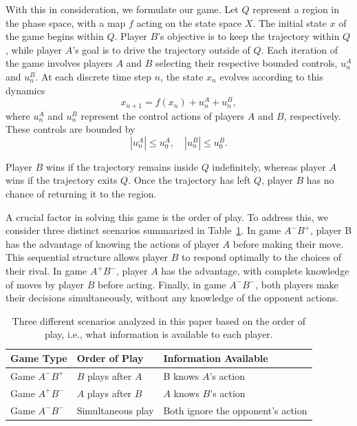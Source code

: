 With this in consideration, we formulate our game. Let $Q$ represent a region in the phase space, with a map $f$ acting on the state space $X$. The initial state $x$ of the game begins within $Q$. Player $B$'s objective is to keep the trajectory within $Q$, while player $A$'s goal is to drive the trajectory outside of $Q$. Each iteration of the game involves players $A$ and $B$ selecting their respective bounded controls, $u_n^A$ and $u_n^B$. At each discrete time step $n$, the state $x_n$ evolves according to this dynamics
\begin{equation}
    x_{n+1} = f(x_n) + u_n^A + u_n^B,
\end{equation}
where $u_n^A $ and $u_n^B $ represent the control actions of players $A$ and $B$, respectively. These controls are bounded by
\begin{equation}
    |u_n^A| \leq u_0^A, \quad |u_n^B| \leq u_0^B.
\end{equation}


Player $B$ wins if the trajectory remains inside $Q$ indefinitely, whereas player $A$ wins if the trajectory exits $Q$. Once the trajectory has left $Q$, player $B$ has no chance of returning it to the region.

A crucial factor in solving this game is the order of play. To address this, we consider three distinct scenarios summarized in Table~\ref{tab:games}. In game $A^{-}B^{+}$, player B has the advantage of knowing the actions of player $A$ before making their move. This sequential structure allows player $B$ to respond optimally to the choices of their rival. In game $A^{+}B^{-}$, player $A$ has the advantage, with complete knowledge of moves by player $B$ before acting. Finally, in game $A^{-}B^{-}$, both players make their decisions simultaneously, without any knowledge of the opponent actions.  



\begin{table}[h!]
\centering
\begin{tabular}{|p{3cm}|p{4cm}|p{7.3cm}|}
\hline
\textbf{Game Type} & \textbf{Order of Play} & \textbf{Information Available} \\
\hline
Game $A^{-}B^{+}$ & $B$ plays after $A$ & B knows $A$'s action  \\
\hline
Game $A^{+}B^{-}$ & $A$ plays after $B$ & $A$ knows $B$'s action  \\
\hline
Game $A^{-}B^{-}$ & Simultaneous play & Both ignore the opponent's action  \\
\hline
\end{tabular}
\caption{Three different scenarios analyzed in this paper based on the order of play, i.e., what information is available to each player.}
\label{tab:games}
\end{table}











